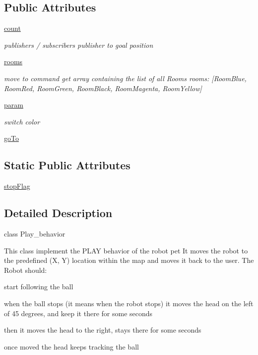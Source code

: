 \subsection*{Public Attributes}
\begin{DoxyCompactItemize}
\item 
\hyperlink{classstate__machine_1_1Play_a276faca960b7836501ec5e2f0da038a3}{count}
\begin{DoxyCompactList}\small\item\em publishers / subscribers publisher to goal position \end{DoxyCompactList}\item 
\hyperlink{classstate__machine_1_1Play_a1fae7e215371b18cf947e8cd1babb346}{rooms}
\begin{DoxyCompactList}\small\item\em move to command get array containing the list of all Rooms rooms\+: \mbox{[}\textquotesingle{}Room\+Blue\textquotesingle{}, \textquotesingle{}Room\+Red\textquotesingle{}, \textquotesingle{}Room\+Green\textquotesingle{}, \textquotesingle{}Room\+Black\textquotesingle{}, \textquotesingle{}Room\+Magenta\textquotesingle{}, \textquotesingle{}Room\+Yellow\textquotesingle{}\mbox{]} \end{DoxyCompactList}\item 
\hyperlink{classstate__machine_1_1Play_a41a074c4bf967a31676ee879b4522e85}{param}
\begin{DoxyCompactList}\small\item\em switch color \end{DoxyCompactList}\item 
\hyperlink{classstate__machine_1_1Play_a9ffb340aab6992abdb021d3a3aa59099}{go\+To}
\end{DoxyCompactItemize}
\subsection*{Static Public Attributes}
\begin{DoxyCompactItemize}
\item 
\hyperlink{classstate__machine_1_1Play_a60431dacf2811b3dc7e954473c281985}{stop\+Flag}
\end{DoxyCompactItemize}


\subsection{Detailed Description}
class Play\+\_\+behavior 

This class implement the P\+L\+AY behavior of the robot pet It moves the robot to the predefined (X, Y) location within the map and moves it back to the user. The Robot should\+:
\begin{DoxyItemize}
\item start following the ball
\item when the ball stops (it means when the robot stops) it moves the head on the left of 45 degrees, and keep it there for some seconds
\item then it moves the head to the right, stays there for some seconds
\item once moved the head keeps tracking the ball 
\end{DoxyItemize}

